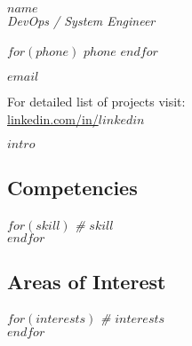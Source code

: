 \documentclass[$fontsize$, a4paper]{article}
\begin{document}
{\LARGE $name$}\\[.2cm]
{\large \textsl{DevOps / System Engineer}}\\[.1cm]


\begin{multicols}{2}

$for(phone)$
$phone$
$endfor$

\href{mailto:$email$}{$email$}\\

\columnbreak

For detailed list of projects visit:\\
\href{http://linkedin.com/in/$linkedin$}{linkedin.com/in/$linkedin$}


\end{multicols}



$intro$



\begin{multicols}{2}

\subsection*{Competencies}
$for(skill)$
\emph{\#} \enspace $skill$\\
$endfor$

\columnbreak

\subsection*{Areas of Interest}
$for(interests)$
\emph{\#} \enspace $interests$\\
$endfor$

\end{multicols}


\end{document}
